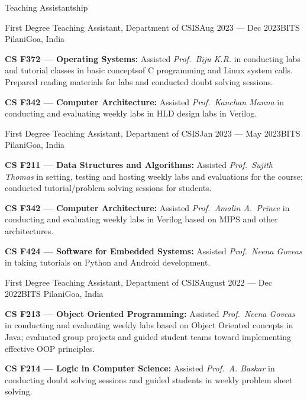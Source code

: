 
\begin{rSection}{Teaching Assistantship}

    \begin{rSubsection}{First Degree Teaching Assistant, Department of CSIS}{Aug 2023 --- Dec 2023}{BITS Pilani}{Goa, India}
    \item \textbf{CS F372 --- Operating Systems:} Assisted \textit{Prof.\ Biju K.R.} in conducting labs and tutorial classes in basic conceptsof C programming and Linux system calls. Prepared reading materials for labs and conducted doubt solving sessions.
    \item \textbf{CS F342 --- Computer Architecture:} Assisted \textit{Prof.\ Kanchan Manna} in conducting and evaluating weekly labs in HLD design labs in Verilog.
    \end{rSubsection}

    \begin{rSubsection}{First Degree Teaching Assistant, Department of CSIS}{Jan 2023 --- May 2023}{BITS Pilani}{Goa, India}
    \item \textbf{CS F211 --- Data Structures and Algorithms:} Assisted \textit{Prof.\ Sujith Thomas} in setting, testing and hosting weekly labs and evaluations for the course; conducted tutorial/problem solving sessions for students.
    \item \textbf{CS F342 --- Computer Architecture:} Assisted \textit{Prof.\ Amalin A.\ Prince} in conducting and evaluating weekly labs in Verilog based on MIPS and other architectures.
    \item \textbf{CS F424 --- Software for Embedded Systems:} Assisted \textit{Prof.\ Neena Goveas} in taking tutorials on Python and Android development.
    \end{rSubsection}

    \begin{rSubsection}{First Degree Teaching Assistant, Department of CSIS}{August 2022 --- Dec 2022}{BITS Pilani}{Goa, India}
    \item \textbf{CS F213 --- Object Oriented Programming:} Assisted \textit{Prof.\ Neena Goveas} in conducting and evaluating weekly labs based on Object Oriented concepts in Java; evaluated group projects and guided student teams toward implementing effective OOP principles.
    \item \textbf{CS F214 --- Logic in Computer Science:} Assisted \textit{Prof.\ A. Baskar} in conducting doubt solving sessions and guided students in weekly problem sheet solving.
    \end{rSubsection}

\end{rSection}
